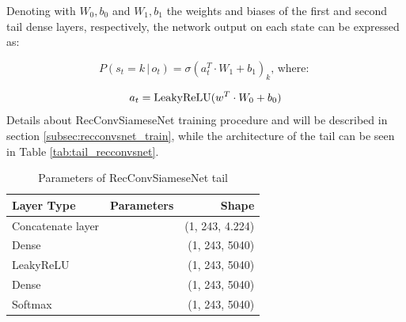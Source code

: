 Denoting with $W_0, b_0$ and $W_1, b_1$ the weights and biases of the first and second tail dense layers, respectively, the network output on each state can be expressed as:

$$P(s_t = k \, | \, o_t) = \sigma(a_t^T \cdot W_1 + b_1)_k \text{, where: }$$

$$a_t = \operatorname{LeakyReLU}(w^T \cdot W_0 + b_0)$$
Details about RecConvSiameseNet training procedure and will be described in section \vref{subsec:recconvsnet_train}, while the architecture of the tail can be seen in Table \vref{tab:tail_recconvsnet}.

\begin{footnotesize}
	\begin{table}
		\centering
		\caption{Parameters of RecConvSiameseNet tail}
		\label{tab:tail_recconvsnet}
		\begin{tabularx}{0.5\textwidth}{XXr}%
			\toprule
			\textbf{Layer Type} & \textbf{Parameters}                                                                   & \textbf{Shape}    \\
			\midrule
			Concatenate layer 	&  																						& (1, 243, 4.224) \\
			Dense               & 				                                                                        & (1, 243, 5040) \\[0.25cm]
			LeakyReLU			&																						& (1, 243, 5040) \\
			Dense				&   																					& (1, 243, 5040) \\
			Softmax				&																						& (1, 243, 5040) \\
			\bottomrule
		\end{tabularx}
		
	\end{table}
	
\end{footnotesize}

